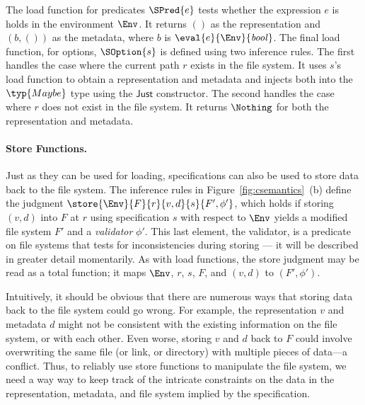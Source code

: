 The load function for predicates $\SPred{e}$ tests whether the
expression $e$ is holds in the environment $\Env$. It returns $()$ as
the representation and $(b,())$ as the metadata, where $b$ is
$\eval{e}{\Env}{\mathit{bool}}$. The final load function, for options,
$\SOption{s}$ is defined using two inference rules. The first handles
the case where the current path $r$ exists in the file system. It uses
$s$'s load function to obtain a representation and metadata and
injects both into the $\typ{Maybe}$ type using the $\mathsf{Just}$
constructor. The second handles the case where $r$ does not exist in
the file system. It returns $\Nothing$ for both the representation and
metadata.

\paragraph*{Store Functions.}
%
Just as they can be used for loading, \forest{} specifications can
also be used to store data back to the file system. The inference
rules in Figure~\ref{fig:csemantics}~(b) define the judgment
$\store{\Env}{F}{r}{v,d}{s}{F',\phi'}$, which holds if storing $(v,d)$
into $F$ at $r$ using specification $s$ with respect to $\Env$ yields
a modified file system $F'$ and a {\em validator} $\phi'$.  This
last element, the validator, is a
predicate on file systems that tests for inconsistencies during
storing --- it will be described in greater detail momentarily. As with load functions, the store judgment may be read as a total
function; it maps $\Env$, $r$, $s$, $F$, and $(v,d)$ to $(F',\phi')$.

Intuitively, it should be obvious that there are numerous ways that
storing data back to the file system could go wrong. For example, the
representation $v$ and metadata $d$ might not be consistent with the
existing information on the file system, or with each other. Even
worse, storing $v$ and $d$ back to $F$ could involve overwriting the
same file (or link, or directory) with multiple pieces of data---a
conflict. Thus, to reliably use store functions to manipulate the file
system, we need a way way to keep track of the intricate constraints
on the data in the representation, metadata, and file system implied
by the specification.

